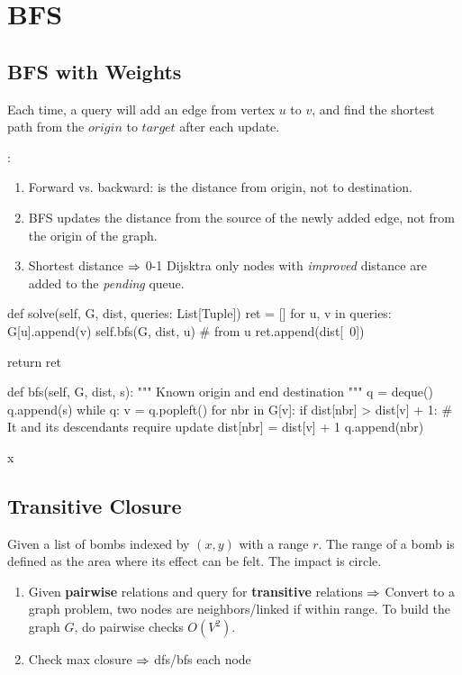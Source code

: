 \section{BFS}
\subsection{BFS with Weights}
Each time, a query will add an edge from vertex $u$ to $v$, and find the shortest path from the $origin$ to $target$ after each update. 

:
\begin{enumerate}
\item Forward vs. backward:  is the distance from origin, not to destination.
\item BFS updates the distance from the source of the newly added edge, not from the origin of the graph.
\item Shortest distance $\Rightarrow$ 0-1 Dijsktra only nodes with \textit{improved} distance are added to the \textit{pending} queue.
\end{enumerate}
\begin{python}
def solve(self, G, dist, queries: List[Tuple])
    ret = []
    for u, v in queries:
        G[u].append(v)
        self.bfs(G, dist, u)  # from u
        ret.append(dist[~0])
    
    return ret
    
def bfs(self, G, dist, s):
    """
    Known origin and end destination
    """
    q = deque()
    q.append(s)
    while q:
        v = q.popleft()
        for nbr in G[v]:
            if dist[nbr] > dist[v] + 1:
                # It and its descendants require update
                dist[nbr] = dist[v] + 1
                q.append(nbr)
\end{python}
x\subsection{Transitive Closure}
 Given a list of bombs indexed by $(x,y)$ with a range $r$. The range of a bomb is defined as the area where its effect can be felt. The impact is circle. 

\begin{enumerate}
\item Given \textbf{pairwise} relations and query for \textbf{transitive} relations $\Rightarrow$ Convert to a graph problem, two nodes are neighbors/linked if within range. To build the graph $G$, do pairwise checks $O(V^2)$.
\item Check max closure $\Rightarrow$ dfs/bfs each node
\end{enumerate}

